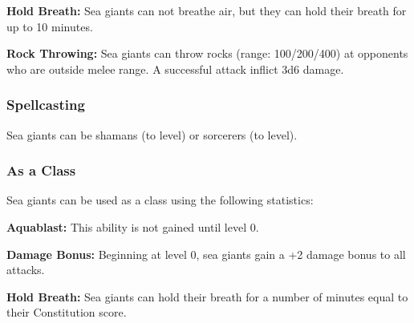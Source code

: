 \begin{multicols*}{2}
\textbf{Hold Breath:} Sea giants can not breathe air, but they can hold their breath for up to 10 minutes.

\textbf{Rock Throwing:} Sea giants can throw rocks (range: 100/200/400) at opponents who are outside melee range. A successful attack inflict 3d6 damage.

\subsubsection{Spellcasting}
Sea giants can be shamans (to  level) or sorcerers (to  level).

\subsubsection{As a Class}
Sea giants can be used as a class using the following statistics:

\textbf{Aquablast:} This ability is not gained until level 0.

\textbf{Damage Bonus:} Beginning at level 0, sea giants gain a +2 damage bonus to all attacks.

\textbf{Hold Breath:} Sea giants can hold their breath for a number of minutes equal to their Constitution score.



\end{multicols*}
